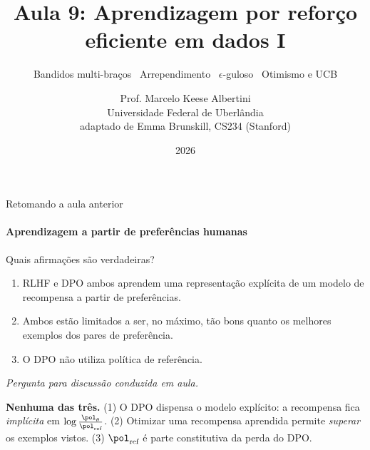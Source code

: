 \documentclass[aspectratio=169, 10pt]{beamer}
\title[Aula 9 — Bandidos e arrependimento]{Aula 9: Aprendizagem por reforço\\ eficiente em dados I}
\subtitle[Aprendizagem por Reforço]{Bandidos multi-braços \textbullet\ Arrependimento \textbullet\ $\epsilon$-guloso \textbullet\ Otimismo e UCB}
\author[Prof. Marcelo K. Albertini]{Prof. Marcelo Keese Albertini \\
  \footnotesize Universidade Federal de Uberlândia \\
  \footnotesize adaptado de Emma Brunskill, CS234 (Stanford)}
\institute{Universidade Federal de Uberlândia}
\date{2026}
\newcommand{\paradiscussao}{\smallskip
  {\footnotesize\color{rlCinza}\itshape Pergunta para discussão conduzida em aula.}}
\begin{document}
\begin{frame}\titlepage\end{frame}

\begin{frame}{Retomando a aula anterior}
  \framesubtitle{Aprendizagem a partir de preferências humanas}

  \begin{quizbox}[fontupper=\footnotesize]{}
    Quais afirmações são verdadeiras?
    \begin{enumerate}\setlength{\itemsep}{0ex}
      \item RLHF e DPO ambos aprendem uma representação \alert{explícita}
            de um modelo de recompensa a partir de preferências.
      \item Ambos estão limitados a ser, no máximo, tão bons quanto os
            melhores exemplos dos pares de preferência.
      \item O DPO não utiliza política de referência.
    \end{enumerate}
    \paradiscussao
  \end{quizbox}

  \pause

  \begin{respbox}[fontupper=\footnotesize]
    \textbf{Nenhuma das três.} (1) O DPO dispensa o modelo explícito: a
    recompensa fica \emph{implícita} em
    $\log\frac{\pol_\theta}{\pol_{\text{ref}}}$. (2) Otimizar uma recompensa
    aprendida permite \emph{superar} os exemplos vistos. (3)
    $\pol_{\text{ref}}$ é parte constitutiva da perda do DPO.
  \end{respbox}
\end{frame}
\end{document}
